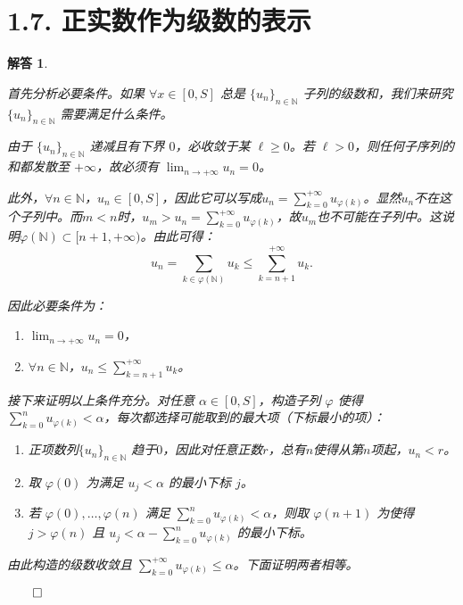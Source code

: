 \documentclass[12pt,UTF8]{ctexbook}
\theoremstyle{exercisestyle}
\theoremstyle{solutionstyle}
\newtheorem*{solution*}{解答}
\newenvironment{solution}
  {\begin{solution*}}
  {\hfill\ensuremath{\qed}\end{solution*}}
\begin{document}
\section{1.7. 正实数作为级数的表示}
\begin{solution}
\begin{subquestions}
\item 首先分析必要条件。如果 $\forall x \in [0, S]$ 总是 $\{u_n\}_{n\in\mathbb{N}}$ 子列的级数和，我们来研究 $\{u_n\}_{n\in\mathbb{N}}$ 需要满足什么条件。

由于 $\{u_n\}_{n\in\mathbb{N}}$ 递减且有下界 $0$，必收敛于某 $\ell \geqslant 0$。若 $\ell > 0$，则任何子序列的和都发散至 $+\infty$，故必须有 $\displaystyle \lim_{n \to +\infty} u_n = 0$。

此外，$\forall n \in \mathbb{N}$，$u_n\in [0, S]$，因此它可以写成$\displaystyle u_n = \sum_{k=0}^{+\infty} u_{\varphi(k)}$。显然$u_n$不在这个子列中。而$m < n$时，$\displaystyle u_m > u_n = \sum_{k=0}^{+\infty} u_{\varphi(k)}$，故$u_m$也不可能在子列中。这说明$\varphi(\mathbb{N}) \subset [n+1, +\infty)$。由此可得：
$$
u_n = \sum_{k\in\varphi(\mathbb{N})} u_k \leqslant \sum_{k=n+1}^{+\infty} u_k.
$$

因此必要条件为：
\begin{enumerate}[label=\arabic*.]
    \item $\displaystyle\lim_{n \to +\infty} u_n = 0$，
    \item $\forall n \in \mathbb{N}$，$\displaystyle u_n \leq \sum_{k=n+1}^{+\infty} u_k$。
\end{enumerate}

接下来证明以上条件充分。对任意 $\alpha \in [0, S]$，构造子列 $\varphi$ 使得 $\displaystyle\sum_{k=0}^n u_{\varphi(k)} < \alpha$，每次都选择可能取到的最大项（下标最小的项）：
\begin{enumerate}[label=\arabic*.]
\item 正项数列$\{u_n\}_{n\in\mathbb{N}}$ 趋于$0$，因此对任意正数$r$，总有$n$使得从第$n$项起，$u_n < r$。
\item 取 $\varphi(0)$ 为满足 $u_j < \alpha$ 的最小下标 $j$。
\item 若 $\varphi(0),\dots,\varphi(n)$ 满足 $\sum_{k=0}^n u_{\varphi(k)} < \alpha$，则取 $\varphi(n+1)$ 为使得 $j > \varphi(n)$ 且 $u_j < \alpha - \sum_{k=0}^n u_{\varphi(k)}$ 的最小下标。
\end{enumerate}

由此构造的级数收敛且 $\displaystyle \sum_{k=0}^{+\infty} u_{\varphi(k)} \leq \alpha$。下面证明两者相等。


\end{subquestions}
\end{solution}
\end{document}

